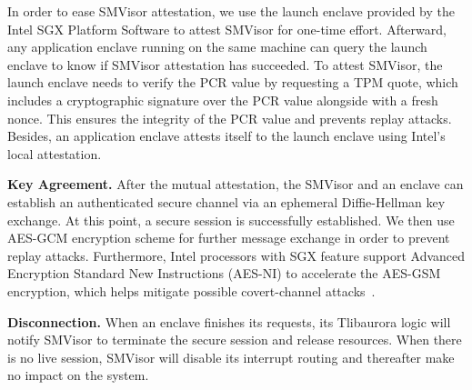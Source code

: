 In order to ease SMVisor attestation, we use the launch enclave provided by the Intel SGX Platform Software to attest SMVisor for one-time effort. Afterward, any application enclave running on the same machine can query the launch enclave to know if SMVisor attestation has succeeded. To attest  SMVisor, the launch enclave needs to verify the PCR value by requesting a TPM quote, which includes a cryptographic signature over the PCR value alongside with a fresh nonce. This ensures the integrity of the PCR value and prevents replay attacks. Besides, an application enclave attests itself to the launch enclave using Intel's local attestation.

\textbf{Key Agreement.}
After the mutual attestation, the SMVisor and an enclave can establish an authenticated secure channel via an ephemeral Diffie-Hellman key exchange.
At this point, a secure session is successfully established. We then use AES-GCM encryption scheme for further message exchange in order to prevent replay attacks. Furthermore, Intel processors with SGX feature support Advanced Encryption Standard New Instructions (AES-NI) to accelerate the AES-GSM encryption, which helps mitigate possible covert-channel attacks~\cite{xu_controlled-channel_2015, DBLP:conf/uss/BulckWKPS17, DBLP:conf/usenix/HahnelCP17}.



\textbf{Disconnection.}
When an enclave finishes its requests, its Tlibaurora logic will notify SMVisor to terminate the secure session and release resources. When there is no live session, SMVisor will disable its interrupt routing and thereafter make no impact on the system.

